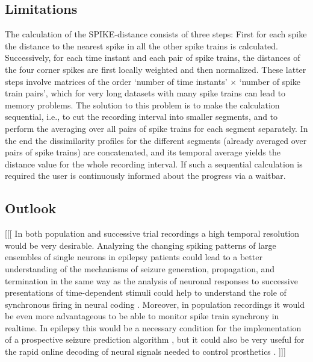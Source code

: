 \documentclass[10pt,twocolumn]{elsart5p}
\begin{document}
\subsection{\label{ss:Limitations} Limitations}

The calculation of the SPIKE-distance consists of three steps: First for each spike the distance to the nearest spike in all the other spike trains is calculated. Successively, for each time instant and each pair of spike trains, the distances of the four corner spikes are first locally weighted and then normalized. These latter steps involve matrices of the order `number of time instants' $\times$ `number of spike train pairs', which for very long datasets with many spike trains can lead to memory problems. The solution to this problem is to make the calculation sequential, i.e., to cut the recording interval into smaller segments, and to perform the averaging over all pairs of spike trains for each segment separately. In the end the dissimilarity profiles for the different segments (already averaged over pairs of spike trains) are concatenated, and its temporal average yields the distance value for the whole recording interval. If such a sequential calculation is required the user is continuously informed about the progress via a waitbar.



\subsection{\label{ss:Outlook} Outlook}

[[[ In both population and successive trial recordings a high temporal resolution would be very desirable. Analyzing the changing spiking patterns of large ensembles of single neurons in epilepsy patients could lead to a better understanding of the mechanisms of seizure generation, propagation, and termination \citep{Truccolo11, Bower12} in the same way as the analysis of neuronal responses to successive presentations of time-dependent stimuli could help to understand the role of synchronous firing in neural coding \citep{Miller08}. Moreover, in population recordings it would be even more advantageous to be able to monitor spike train synchrony in realtime. In epilepsy this would be a necessary condition for the implementation of a prospective seizure prediction algorithm \citep{Mormann07}, but it could also be very useful for the rapid online decoding of neural signals needed to control prosthetics \citep{Hochberg06, Sanchez08}. ]]]
\end{document}
